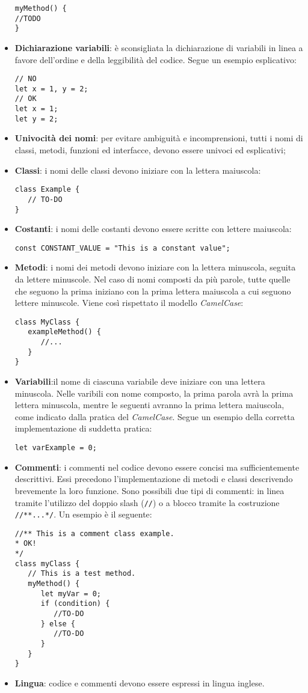 \begin{itemize}
\begin{lstlisting}
myMethod() {
//TODO
}			\end{lstlisting}
			\item \textbf{Dichiarazione variabili}: è sconsigliata la dichiarazione di variabili in linea a favore dell’ordine e della leggibilità del codice. Segue un esempio esplicativo: 
			\begin{lstlisting}
// NO
let x = 1, y = 2;
// OK
let x = 1;
let y = 2;
			\end{lstlisting}
			\item \textbf{Univocità dei nomi}: per evitare ambiguità e incomprensioni, tutti i nomi di classi, metodi, funzioni ed interfacce, devono essere univoci ed esplicativi;
			\item \textbf{Classi}: i nomi delle classi devono iniziare con la lettera maiuscola:
\begin{lstlisting}
class Example {
   // TO-DO
}
\end{lstlisting}
			\item \textbf{Costanti}: i nomi delle costanti devono essere scritte con lettere maiuscola:
\begin{lstlisting}
const CONSTANT_VALUE = "This is a constant value";
\end{lstlisting}
			\item \textbf{Metodi}: i nomi dei metodi devono iniziare con la lettera minuscola, seguita da lettere minuscole. Nel caso di nomi composti da più parole, tutte quelle che seguono la prima iniziano con la prima lettera maiuscola a cui seguono lettere minuscole. Viene così rispettato il modello \textit{CamelCase}\glo:
\begin{lstlisting}
class MyClass {
   exampleMethod() {
      //...
   }
}
\end{lstlisting}
			\item \textbf{Variabili}:il nome di ciascuna variabile deve iniziare con una lettera minuscola. Nelle varibili con nome composto, la prima parola
avrà la prima lettera minuscola, mentre le seguenti avranno la
prima lettera maiuscola, come indicato dalla pratica del \textit{CamelCase}.
Segue un esempio della corretta implementazione di suddetta pratica:
\begin{lstlisting}
let varExample = 0;
\end{lstlisting}
			\item \textbf{Commenti}: i commenti nel codice devono essere concisi ma sufficientemente descrittivi. Essi precedono l’implementazione di metodi e classi
descrivendo brevemente la loro funzione. Sono possibili due tipi di commenti: in linea tramite l’utilizzo del doppio slash (\texttt{//}) o a blocco tramite la costruzione \texttt{//**...*/}. Un esempio è il seguente:
\begin{lstlisting}
//** This is a comment class example.
* OK!
*/
class myClass {
   // This is a test method.
   myMethod() {
      let myVar = 0; 
      if (condition) {
         //TO-DO
      } else {
         //TO-DO
      }
   }
}
\end{lstlisting}
			\item \textbf{Lingua}: codice e commenti devono essere espressi in lingua inglese.
		\end{itemize}
